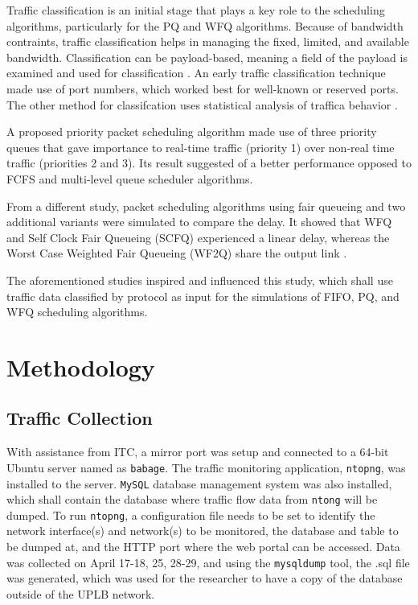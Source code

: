 \documentclass[journal]{IEEE/IEEEtran}
\begin{document}
Traffic classification is an initial stage that plays a key role to the scheduling algorithms, particularly for the PQ and WFQ algorithms. Because of bandwidth contraints, traffic classification helps in managing the fixed, limited, and available bandwidth. Classification can be payload-based, meaning a field of the payload is examined and used for classification \cite[Chapter~5]{cisco_2008}. An early traffic classification technique \cite{schneider_1996} made use of port numbers, which worked best for well-known or reserved ports. The other method for classifcation uses statistical analysis of traffica behavior \cite[Chapter~5]{cisco_2008}.

A proposed priority packet scheduling algorithm \cite{karim_2012} made use of three priority queues that gave importance to real-time traffic (priority 1) over non-real time traffic (priorities 2 and 3). Its result suggested of a better performance opposed to FCFS and multi-level queue scheduler algorithms.

From a different study, packet scheduling algorithms using fair queueing and two additional variants were simulated to compare the delay. It showed that WFQ and Self Clock Fair Queueing (SCFQ) experienced a linear delay, whereas the Worst Case Weighted Fair Queueing (WF2Q) share the output link \cite{muhilan_2013}.

The aforementioned studies inspired and influenced this study, which shall use traffic data classified by protocol as input for the simulations of FIFO, PQ, and WFQ scheduling algorithms.

\section{Methodology}
\subsection{Traffic Collection}
With assistance from ITC, a mirror port was setup and connected to a 64-bit Ubuntu server named as \texttt{babage}. The traffic monitoring application, \texttt{ntopng}, was installed to the server. \texttt{MySQL} database management system was also installed, which shall contain the database where traffic flow data from \texttt{ntong} will be dumped. To run \texttt{ntopng}, a configuration file needs to be set to identify the network interface(s) and network(s) to be monitored, the database and table to be dumped at, and the HTTP port where the web portal can be accessed. Data was collected on April 17-18, 25, 28-29, and using the \texttt{mysqldump} tool, the .sql file was generated, which was used for the researcher to have a copy of the database outside of the UPLB network. 
\end{document}
